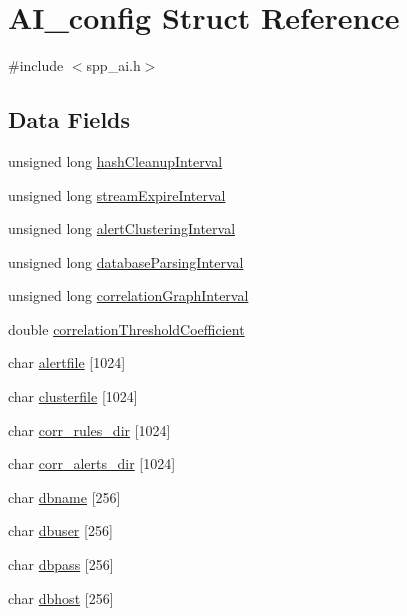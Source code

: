 \hypertarget{structAI__config}{
\section{AI\_\-config Struct Reference}
\label{structAI__config}
}


{\ttfamily \#include $<$spp\_\-ai.h$>$}

\subsection*{Data Fields}
\begin{DoxyCompactItemize}
\item 
unsigned long \hyperlink{structAI__config_a9f7680615027d4fb74b4aa144a7028a4}{hashCleanupInterval}
\item 
unsigned long \hyperlink{structAI__config_abbe77d5f94b8c5164bea47acba09c98b}{streamExpireInterval}
\item 
unsigned long \hyperlink{structAI__config_a7d0d098b8263aa3d8415b11d1ec7f93d}{alertClusteringInterval}
\item 
unsigned long \hyperlink{structAI__config_ae6ca715cab1d90b70c3aad443133c263}{databaseParsingInterval}
\item 
unsigned long \hyperlink{structAI__config_aa736375e57a59936e2e782b7cd200e41}{correlationGraphInterval}
\item 
double \hyperlink{structAI__config_adf6ef0faedfb4dea0a1353e781b14883}{correlationThresholdCoefficient}
\item 
char \hyperlink{structAI__config_a2efa9590d7eea6dce8b5dd9aa76ed8ca}{alertfile} \mbox{[}1024\mbox{]}
\item 
char \hyperlink{structAI__config_a6da02a3f7116fd3810a41b738e8883a3}{clusterfile} \mbox{[}1024\mbox{]}
\item 
char \hyperlink{structAI__config_ab7ea93bbe72b85c4019b4f5656ad62fc}{corr\_\-rules\_\-dir} \mbox{[}1024\mbox{]}
\item 
char \hyperlink{structAI__config_ae68f5489e2ec9ea1408f98fe36d050c9}{corr\_\-alerts\_\-dir} \mbox{[}1024\mbox{]}
\item 
char \hyperlink{structAI__config_ac8a93607f12106e2f5c9b43af27107da}{dbname} \mbox{[}256\mbox{]}
\item 
char \hyperlink{structAI__config_aa004adebfdafb6d14092aecd7f4912b0}{dbuser} \mbox{[}256\mbox{]}
\item 
char \hyperlink{structAI__config_aa1cda349763faf60b2ebdbf2d187ae7d}{dbpass} \mbox{[}256\mbox{]}
\item 
char \hyperlink{structAI__config_a8e56f1a1b2095d3d329c8068ea0f3aab}{dbhost} \mbox{[}256\mbox{]}
\end{DoxyCompactItemize}


